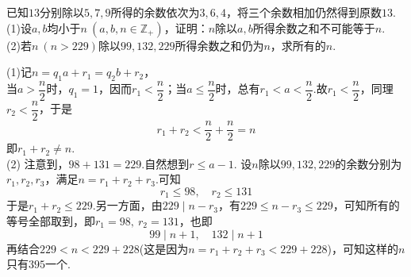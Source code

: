 \documentclass[cn,hazy,black,10pt,normal]{elegantnote}
\newenvironment{guess}{
  \color{guess}}{\newline \color{black}}
\begin{document}
\begin{problem} %
	已知$13$分别除以$5,7,9$所得的余数依次为$3,6,4$，将三个余数相加仍然得到原数$13$. \\
	(1)设$a,b$均小于$n~(a,b,n \in \mathbb{Z}_+)$，证明：$n$除以$a,b$所得余数之和不可能等于$n$. \\
	(2)若$n~(n>229)$除以$99,132,229$所得余数之和仍为$n$，求所有的$n$.
\end{problem}
\begin{solution}
	(1)记$n=q_1a+r_1=q_2b+r_2$， \\
	当$a>\dfrac{n}{2}$时，$q_1=1$，因而$r_1<\dfrac{n}{2}$；当$a \leq \dfrac{n}{2}$时，总有$r_1 < a <\dfrac{n}{2}$.故$r_1<\dfrac{n}{2}$，同理$r_2<\dfrac{n}{2}$，于是$$r_1+r_2 < \frac{n}{2} + \frac{n}{2} = n$$
	即$r_1+r_2 \neq n$. \\
	(2)\begin{guess}
		注意到，$98+131=229$.自然想到$r \leq a-1$.
	\end{guess}
	设$n$除以$99,132,229$的余数分别为$r_1,r_2,r_3$，满足$n=r_1+r_2+r_3$.可知$$r_1 \leq 98,\quad r_2 \leq 131$$
	于是$r_1+r_2 \leq 229$.另一方面，由$229\mid n-r_3$，有$229 \leq n-r_3 \leq 229$，可知所有的等号全部取到，即$r_1=98,~r_2=131$，也即$$99\mid n+1,\quad 132\mid n+1$$
	再结合$229<n<229+228$(这是因为$n=r_1+r_2+r_3<229+228$)，可知这样的$n$只有$395$一个.
\end{solution}
\end{document}
